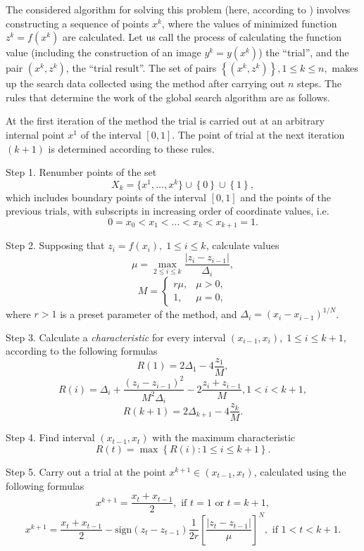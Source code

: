 \documentclass[smallcondensed]{svjour3}     %
\begin{document}
The considered algorithm for solving this problem (here, according to \cite{RefStrongin2000}) involves constructing a sequence of points $x^k$, where the values of minimized function $z^k = f(x^k)$ are calculated. Let us call the process of calculating the function value (including the construction of an image $y^k=y(x^k)$) the ``trial'', and the pair $(x^k, z^k)$, the ``trial result''. The set of pairs $\left\{(x^k, z^k)\right\}, 1\leq k\leq n,$ makes up the search data collected using the method after carrying out $n$ steps. The rules that determine the work of the global search algorithm are as follows.

At the first iteration of the method the trial is carried out at an arbitrary internal point $x^1$ of the interval $[0,1]$. The point of trial at the next iteration $(k+1)$ is determined according to these rules.

Step 1. Renumber points of the set
\[
X_k=\{x^1,\dots,x^k\}\cup\left\{0\right\}\cup\left\{1\right\},
\]
which includes boundary points of the interval $[0,1]$ and the points of the previous trials, with subscripts in increasing order of coordinate values, i.e.
\[
0=x_0<x_1<\dots <x_k<x_{k+1}=1.
\]

Step 2. Supposing that  $z_i=f(x_i), \; 1\leq i \leq k$, calculate values 
\begin{equation}\label{eq:11}
\mu = \max_{2\leq i \leq k}\frac{\left|z_i-z_{i-1}\right|}{\Delta_i},
\end{equation}
\[
M = \left\{
   \begin{array}{lr}
     r\mu, & \mu > 0,\\
     1, & \mu = 0,
   \end{array}
\right.
 \]
where $r>1$ is a preset parameter of the method, and $\Delta_i=\left(x_i-x_{i-1}\right)^{1/N}$.

Step 3. Calculate a \textit{characteristic} for every interval $(x_{i-1}, x_i), \; 1\leq i \leq k+1,$   according to the following formulas
\[
R(1)=2\Delta_1-4\frac{z_1}{M},
\]
\begin{equation}\label{eq:14}
R(i)=\Delta_i+\frac{(z_i-z_{i-1})^2}{M^2\Delta_i}-2\frac{z_i+z_{i-1}}{M},1<i<k+1,
\end{equation}
\[
R(k+1)=2\Delta_{k+1}-4\frac{z_k}{M}.
\]

Step 4. Find interval $(x_{t-1},x_t)$ with the maximum characteristic
\[
R(t)=\max{\left\{R(i): 1 \leq i \leq k+1\right\}}.
\]

Step 5. Carry out a trial at the point $x^{k+1}\in(x_{t-1},x_t)$, calculated using the following formulas
\[
x^{k+1} = \frac{x_t+x_{t-1}}{2}, \textrm{ if } t=1 \textrm{ or } t=k+1,
\]
\[
x^{k+1} = \frac{x_t+x_{t-1}}{2} - \mathrm{sign}(z_t-z_{t-1})\frac{1}{2r}\left[\frac{\left|z_t-z_{t-1}\right|}{\mu}\right]^N, \textrm{ if } 1<t<k+1.
\]
\end{document}
